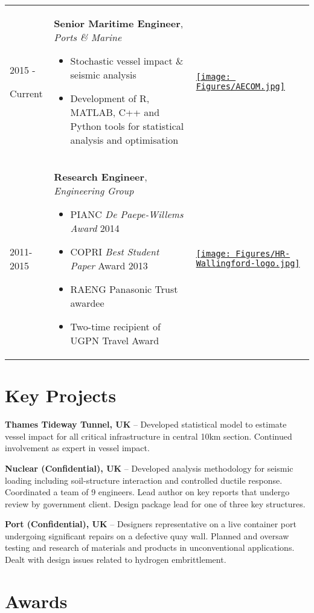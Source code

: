 \documentclass[a4paper]{twentysecondcv} %
\begin{document}
\begin{table}[ht]
\centering
\begin{tabular}{p{} p{} m{}}

2015 - 

Current & \textbf{Senior Maritime Engineer}, \textit{Ports \& Marine}
\begin{itemize}[topsep=0pt]
\item Stochastic vessel impact \& seismic analysis
\item Development of R, MATLAB, C++ and Python tools for statistical analysis and optimisation
\end{itemize}
& \href{http://www.aecom.com/markets/transportation/ports-marine/}{\texttt{[image: Figures/AECOM.jpg]}}
\\

2011-2015 & \textbf{Research Engineer}, \textit{Engineering Group} 
\begin{itemize}[topsep=0pt]
\item PIANC \textit{De Paepe-Willems Award} 2014  
\item COPRI \textit{Best Student Paper} Award 2013
\item RAENG Panasonic Trust awardee
\item Two-time recipient of UGPN Travel Award
\end{itemize}

& \href{http://www.hrwallingford.com/expertise/port-harbour-development}{\texttt{[image: Figures/HR-Wallingford-logo.jpg]}}\\

\end{tabular}
\end{table}

\section{Key Projects}

\textbf{Thames Tideway Tunnel, UK} – Developed statistical model to estimate vessel impact for all critical infrastructure in central 10km section. Continued involvement as expert in vessel impact.

\textbf{Nuclear (Confidential), UK} – Developed analysis methodology for seismic loading including soil-structure interaction and controlled ductile response. Coordinated a team of 9 engineers. Lead author on key reports that undergo review by government client. Design package lead for one of three key structures.

\textbf{Port (Confidential), UK} – Designers representative on a live container port undergoing significant repairs on a defective quay wall. Planned and oversaw testing and research of materials and products in unconventional applications. Dealt with design issues related to hydrogen embrittlement.


\section{Awards}
\end{document}
